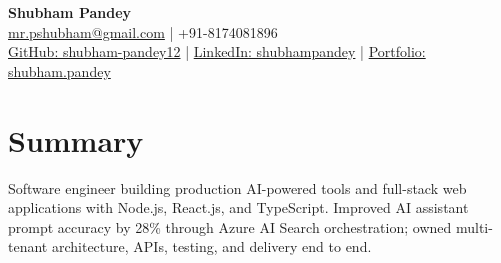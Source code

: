 \documentclass[a4paper,10pt]{article}
\begin{document}
\begin{center}
{\LARGE\textbf{Shubham Pandey}}\\[3pt]
\href{mailto:mr.pshubham@gmail.com}{mr.pshubham@gmail.com} | +91-8174081896\\[2pt]
\href{https://github.com/shubham-pandey12}{GitHub: shubham-pandey12} | \href{https://www.linkedin.com/in/shubham-pandey-a74716199/}{LinkedIn: shubhampandey} | \href{https://shubham-portfolio-mocha.vercel.app/}{Portfolio: shubham.pandey}
\end{center}
\section{Summary}
Software engineer building production AI-powered tools and full-stack web applications with Node.js, React.js, and TypeScript. Improved AI assistant prompt accuracy by 28\% through Azure AI Search orchestration; owned multi-tenant architecture, APIs, testing, and delivery end to end.
\end{document}
